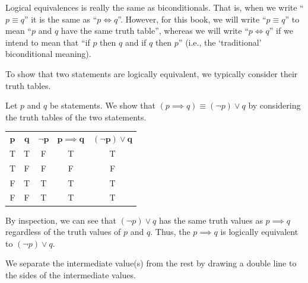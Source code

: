 \begin{remark}
    Logical equivalences is really the same as biconditionals. That is, when we write ``$p \equiv q$'' it is the same as ``$p \iff q$''. However, for this book, we will write ``$p \equiv q$'' to mean ``$p$ and $q$ have the same truth table'', whereas we will write ``$p \iff q$'' if we intend to mean that ``if $p$ then $q$ and if $q$ then $p$'' (i.e., the `traditional' biconditional meaning).
\end{remark}

To show that two statements are logically equivalent, we typically consider their truth tables.

\begin{example}
    Let $p$ and $q$ be statements. We show that $(p \implies q) \equiv (\lnot p) \lor q$ by considering the truth tables of the two statements.
    \begin{table}[H]
        \centering
        \begin{tabular}{|c|c||c||c|c|}
            \hline
            $\boldsymbol{p}$ & $\boldsymbol{q}$ & $\boldsymbol{\lnot p}$ & $\boldsymbol{p \implies q}$ & $\boldsymbol{(\lnot p) \lor q}$ \\ \hhline{|=|=#=#=|=|}
            T & T & F & T & T \\ \hline
            T & F & F & F & F \\ \hline
            F & T & T & T & T \\ \hline
            F & F & T & T & T \\ \hline
        \end{tabular}
    \end{table}
    By inspection, we can see that $(\lnot p) \lor q$ has the same truth values as $p \implies q$ regardless of the truth values of $p$ and $q$. Thus, the $p \implies q$ is logically equivalent to $(\lnot p) \lor q$.
\end{example}
\begin{remark}
    We separate the intermediate value(s) from the rest by drawing a double line to the sides of the intermediate values.
\end{remark}

